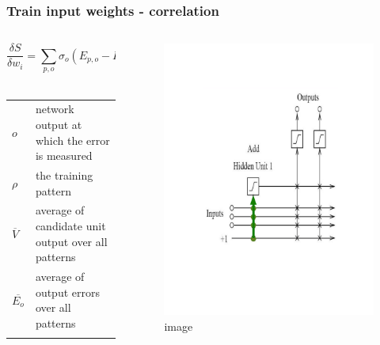 \documentclass{beamer}
\begin{document}
\begin{frame}
  \frametitle{Train input weights - correlation}
	\begin{columns}[t]
		\begin{column}{0.5\textwidth}
      $$ \frac{\delta S}{\delta w_{i}} = \sum_{p,o} \sigma_{o}(E_{p,o} - \overline{E_{o}}) \mathit{f_{p}}^{\prime} I_{i,p} $$
     \\ 
      \begin{center}
        \begin{tabular}{ll}
          \(\mathit{o}\) & network output at which the error is measured\\
          \(\rho\) & the training pattern\\
          \(\overline{V}\) & average of candidate unit output over all patterns\\
          \(\overline{E_{o}}\) & average of output errors over all patterns\\
          & \\
        \end{tabular}
      \end{center}
		\end{column}
		\begin{column}{0.5\textwidth}
      \begin{figure}
        \centering
        \includegraphics[scale=0.5]{trainInputunit.png}
        \caption{image}
      \end{figure}			
		\end{column}
	\end{columns}
\end{frame}
\end{document}
